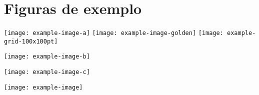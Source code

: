 \chapter{Figuras de exemplo}


\noindent\texttt{[image: example-image-a]}\qquad
\texttt{[image: example-image-golden]}\qquad
\texttt{[image: example-grid-100x100pt]}

\noindent\texttt{[image: example-image-b]} 

\noindent\texttt{[image: example-image-c]} 

\noindent\texttt{[image: example-image]} 